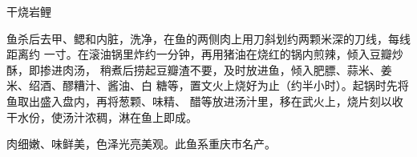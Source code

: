 %
%
%
%
%
%
%
\begin{recipe}{干烧岩鲤}

\ingredients


\preparation

鱼杀后去甲、鳃和内脏，洗净，在鱼的两侧肉上用刀斜划约两颗米深的刀线，每线距离约
一寸。在滚油锅里炸约一分钟，再用猪油在烧红的锅内煎辣，倾入豆瓣炒酥，即掺进肉汤，
稍煮后捞起豆瓣渣不要，及时放进鱼，倾入肥膘、蒜米、姜米、绍酒、醪糟汁、酱油、白
糖等，置文火上烧好为止（约半小时）。起锅时先将鱼取出盛入盘内，再将葱颗、味精、
醋等放进汤汁里，移在武火上，烧片刻以收干水份，使汤汁浓稠，淋在鱼上即成。

\features

肉细嫩、味鲜美，色泽光亮美观。此鱼系重庆市名产。

\end{recipe}


